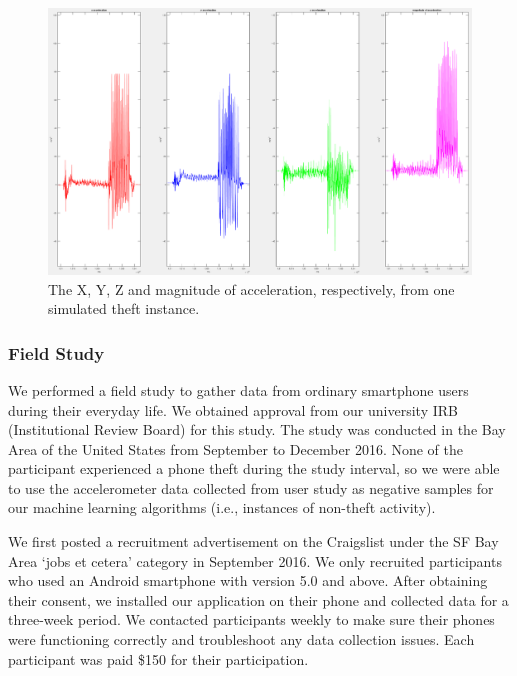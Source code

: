 \documentclass{soups}
\begin{document}
\begin{figure}[t]
\includegraphics[width=1.0\columnwidth]{pos_acc_separated.png}
\caption{The X, Y, Z and magnitude of acceleration, respectively, from one simulated theft instance.}
\label{fig:simtheft}
\end{figure}




\subsubsection{Field Study}
We performed a field study to gather data from ordinary smartphone users
during their everyday life.
We obtained approval from our university IRB (Institutional Review Board) for this study. 
The study was conducted in the Bay Area of the United States from September to December 2016.
None of the participant experienced a phone theft during the study interval,
so we were able to use the accelerometer data collected from user study as negative samples for our machine learning algorithms (i.e., instances of non-theft activity).

We first posted a recruitment advertisement on the Craigslist under the SF Bay Area `jobs et cetera' category in September 2016. 
We only recruited participants who used an Android smartphone with version 5.0 and above.
After obtaining their consent, we installed our application on their phone and collected data for a three-week period.
We contacted participants weekly to make sure their phones were functioning correctly and troubleshoot any data collection issues.
Each participant was paid \$150 for their participation.
\end{document}
